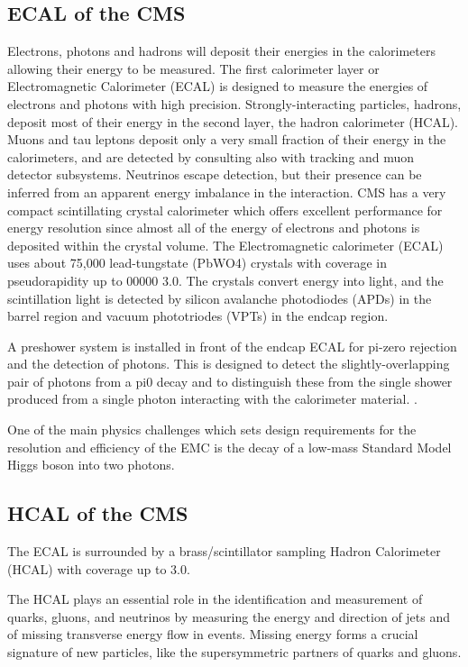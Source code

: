 \subsection{ECAL of the CMS}
Electrons, photons and hadrons will deposit their energies in the calorimeters allowing their energy to be measured. The first calorimeter layer or Electromagnetic Calorimeter (ECAL) is designed to measure the energies of electrons and photons with high precision. Strongly-interacting particles, hadrons, deposit most of their energy in the second layer, the hadron calorimeter (HCAL). Muons and tau leptons deposit only a very small fraction of their energy in the calorimeters, and are detected by consulting also with tracking and muon detector subsystems. Neutrinos escape detection, but their presence can be inferred from an apparent energy imbalance in the interaction.
CMS has a very compact scintillating crystal calorimeter which offers excellent performance for energy resolution since almost all of the energy of electrons and photons is deposited within the crystal volume. The Electromagnetic calorimeter (ECAL) uses about 75,000 lead-tungstate (PbWO4) crystals with coverage in pseudorapidity up to 00000 3.0. The crystals convert energy into light, and the scintillation light is detected by silicon avalanche photodiodes (APDs) in the barrel region and vacuum phototriodes (VPTs) in the endcap region.

A preshower system is installed in front of the endcap ECAL for pi-zero rejection and the detection of photons. This is designed to detect the slightly-overlapping pair of photons from a pi0 decay and to distinguish these from the single shower produced from a single photon interacting with the calorimeter material. .

One of the main physics challenges which sets design requirements for the resolution and efficiency of the EMC is the decay of a low-mass Standard Model Higgs boson into two photons.
\subsection{HCAL of the CMS}
The ECAL is surrounded by a brass/scintillator sampling Hadron Calorimeter (HCAL) with coverage up to 3.0.

The HCAL plays an essential role in the identification and measurement of quarks, gluons, and neutrinos by measuring the energy and direction of jets and of missing transverse energy flow in events. Missing energy forms a crucial signature of new particles, like the supersymmetric partners of quarks and gluons.

